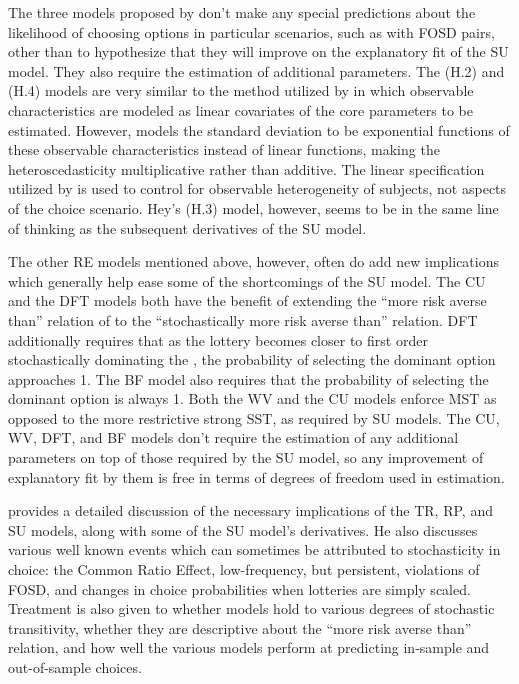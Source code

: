 The three models proposed by \textcite{Hey1995} don't make any special predictions about the likelihood of choosing options in particular scenarios, such as with FOSD pairs, other than to hypothesize that they will improve on the explanatory fit of the SU model.
They also require the estimation of additional parameters.
The (H.2) and (H.4) models are very similar to the method utilized by \textcite[142]{Harrison2008a} in which observable characteristics are modeled as linear covariates of the core parameters to be estimated.
However, \textcite{Hey1995} models the standard deviation to be exponential functions of these observable characteristics instead of linear functions, making the heteroscedasticity multiplicative rather than additive.
The linear specification utilized by \textcite{Harrison2008a} is used to control for observable heterogeneity of subjects, not aspects of the choice scenario.
Hey's (H.3) model, however, seems to be in the same line of thinking as the subsequent derivatives of the SU model.

The other RE models mentioned above, however, often do add new implications which generally help ease some of the shortcomings of the SU model.
The CU and the DFT models both have the benefit of extending the \enquote{more risk averse than} relation of \textcite{Pratt1964} to the \enquote{stochastically more risk averse than} relation.
DFT additionally requires that as the lottery becomes closer to first order stochastically dominating the {\CE}, the probability of selecting the dominant option approaches 1.
The BF model also requires that the probability of selecting the dominant option is always 1.
Both the WV and the CU models enforce MST as opposed to the more restrictive strong SST,  as required by SU models.
The CU, WV, DFT, and BF models don't require the estimation of any additional parameters on top of those required by the SU model, so any improvement of explanatory fit by them is free in terms of degrees of freedom used in estimation.

\textcite{Wilcox2008} provides a detailed discussion of the necessary implications of the TR, RP,  and SU models, along with some of the SU model's derivatives.
He also discusses various well known events which can sometimes be attributed to stochasticity in choice: the Common Ratio Effect, low-frequency, but persistent, violations of FOSD, and changes in choice probabilities when lotteries are simply scaled.{\footnotemark}
Treatment is also given to whether models hold to various degrees of stochastic transitivity, whether they are descriptive about the \enquote{more risk averse than} relation, and how well the various models perform at predicting in-sample and out-of-sample choices.{\footnotemark}

